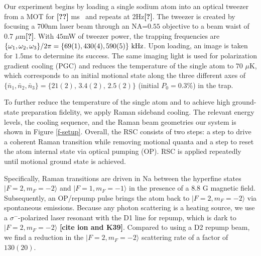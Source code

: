 \documentclass[aps,prl,twocolumn,groupedaddress]{revtex4-1}
\renewcommand{\fxnote}[1]{{\textbf{[#1]}}}
\begin{document}
Our experiment begins by loading a single sodium atom into an optical tweezer from a MOT
for \fxnote{??} ms~\cite{Hutzler2017-LightShifts} and repeats at 2Hz\fxnote{?}.
The tweezer is created by focusing a $700$nm laser beam through an NA=$0.55$ objective to
a beam waist of 0.7 $\mu$m\fxnote{?}.
With $45$mW of tweezer power, the trapping frequencies are
$\{\omega_1,\omega_2,\omega_3\}/2\pi = \{69(1), 430(4), 590(5)\}\ \text{\text{kHz}}$.
Upon loading, an image is taken for $1.5$ms to determine its success.
The same imaging light is used for polarization gradient cooling (PGC) and
reduces the temperature of the single atom to $70$ $\mu$K,
which corresponds to an initial motional state along the three different axes of
$\{\bar n_1, \bar n_2, \bar n_3\}=\{21(2),\, 3.4(2),\, 2.5(2)\}$ (initial $P_0=0.3\%$) in the trap.

To further reduce the temperature of the single atom and
to achieve high ground-state preparation fidelity, we apply Raman sideband cooling.
The relevant energy levels, the cooling sequence, and the Raman beam geometries our system
is shown in Figure \ref{f-setup}. Overall, the RSC consists of two steps:
a step to drive a coherent Raman transition while removing motional quanta and
a step to reset the atom internal state via optical pumping (OP).
RSC is applied repeatedly until motional ground state is achieved.

Specifically, Raman transitions are driven in Na between the hyperfine states
$|F=2, m_F=-2\rangle$ and  $|F=1, m_F=-1\rangle$ in the presence of a $8.8$ G magnetic field.
Subsequently, an OP/repump pulse brings the atom back to $|F=2, m_F=-2\rangle$
via spontaneous emissions.
Because any photon scattering is a heating source,
we use a $\sigma^-$-polarized laser resonant with the D1 line for repump,
which is dark to $|F=2, m_F=-2\rangle$ \fxnote{cite ion and K39}.
Compared to using a D2 repump beam, we find a reduction in the $|F=2, m_F=-2\rangle$
scattering rate of a factor of $130(20)$.
\end{document}
